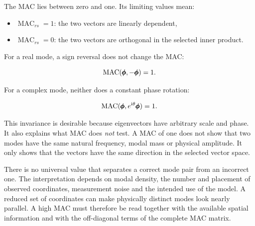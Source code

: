 The MAC lies between zero and one. Its limiting values mean:

\begin{itemize}
    \item $\operatorname{MAC}_{rs}=1$: the two vectors are linearly dependent,
    \item $\operatorname{MAC}_{rs}=0$: the two vectors are orthogonal in the
          selected inner product.
\end{itemize}

For a real mode, a sign reversal does not change the MAC:

\begin{equation}
    \operatorname{MAC}(\pmb{\phi},-\pmb{\phi})=1.
\end{equation}

For a complex mode, neither does a constant phase rotation:

\begin{equation}
    \operatorname{MAC}(\pmb{\phi},e^{\mathrm{i}\theta}\pmb{\phi})=1.
\end{equation}

This invariance is desirable because eigenvectors have arbitrary scale and
phase. It also explains what MAC does \emph{not} test. A MAC of one does not
show that two modes have the same natural frequency, modal mass or physical
amplitude. It only shows that the vectors have the same direction in the
selected vector space.

There is no universal value that separates a correct mode pair from an
incorrect one. The interpretation depends on modal density, the number and
placement of observed coordinates, measurement noise and the intended use of
the model. A reduced set of coordinates can make physically distinct modes look
nearly parallel. A high MAC must therefore be read together with the available
spatial information and with the off-diagonal terms of the complete MAC matrix.

